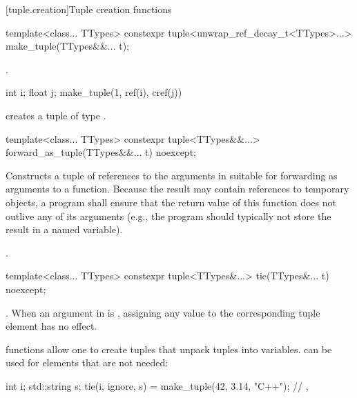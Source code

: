 [tuple.creation]{Tuple creation functions}

%
%
\begin{itemdecl}
template<class... TTypes>
  constexpr tuple<unwrap_ref_decay_t<TTypes>...> make_tuple(TTypes&&... t);
\end{itemdecl}

\begin{itemdescr}
\pnum
\returns
{}.

\pnum
\begin{example}
\begin{codeblock}
int i; float j;
make_tuple(1, ref(i), cref(j))
\end{codeblock}
creates a tuple of type .
\end{example}
\end{itemdescr}

%
%
\begin{itemdecl}
template<class... TTypes>
  constexpr tuple<TTypes&&...> forward_as_tuple(TTypes&&... t) noexcept;
\end{itemdecl}

\begin{itemdescr}
\pnum
\effects
Constructs a tuple of references to the arguments in  suitable
for forwarding as arguments to a function. Because the result may contain references
to temporary objects, a program shall ensure that the return value of this
function does not outlive any of its arguments (e.g., the program should typically
not store the result in a named variable).

\pnum
\returns
{}.
\end{itemdescr}

%
%
%
\begin{itemdecl}
template<class... TTypes>
  constexpr tuple<TTypes&...> tie(TTypes&... t) noexcept;
\end{itemdecl}

\begin{itemdescr}
\pnum
\returns
{}.  When an
argument in  is , assigning
any value to the corresponding tuple element has no effect.

\pnum
\begin{example}
 functions allow one to create tuples that unpack
tuples into variables.  can be used for elements that
are not needed:
\begin{codeblock}
int i; std::string s;
tie(i, ignore, s) = make_tuple(42, 3.14, "C++");
// , 
\end{codeblock}
\end{example}
\end{itemdescr}


